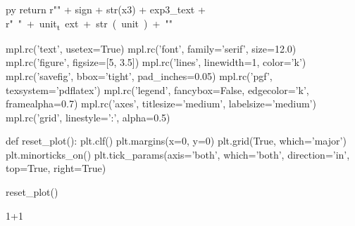 \begin{pythontexcustomcode}[begin]{py}
	return r"\SI{" + sign + str(x3) + exp3_text + r"}{" + unit_text + str(unit) + "}"

mpl.rc('text', usetex=True)
mpl.rc('font', family='serif', size=12.0)
mpl.rc('figure', figsize=[5, 3.5])
mpl.rc('lines', linewidth=1, color='k')
mpl.rc('savefig', bbox='tight', pad_inches=0.05)
mpl.rc('pgf', texsystem='pdflatex')
mpl.rc('legend', fancybox=False, edgecolor='k', framealpha=0.7)
mpl.rc('axes', titlesize='medium', labelsize='medium')
mpl.rc('grid', linestyle=':', alpha=0.5)

def reset_plot():
	plt.clf()
	plt.margins(x=0, y=0)
	plt.grid(True, which='major')
	plt.minorticks_on()
	plt.tick_params(axis='both', which='both', direction='in', top=True, right=True)

reset_plot()
\end{pythontexcustomcode}

\begin{pycode}
1+1
\end{pycode}
